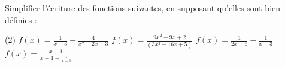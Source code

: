 %
%
Simplifier l'écriture des fonctions suivantes, en supposant qu'elles sont bien définies :
	\begin{tasks}(2)
		\task $f(x) = \frac{1}{x-3} -\frac{4}{x^2-2x-3}$
		\task $f(x) = \frac{9x^2 -9x +2}{(3x^2-16x+5)}$
		\task $f(x) = \frac{1}{2x-6}-\frac{1}{x-3}$
	    \task $f(x) = \frac{x-1}{x-1 -\frac{1}{x-1}}$
	\end{tasks}
